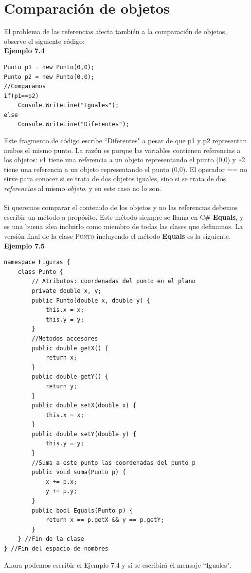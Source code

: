 \documentclass[12pt,a4paper]{report}
\begin{document}
\section{Comparación de objetos}
El problema de las referencias afecta también a la comparación de objetos, observe el siguiente código:\\\textbf{Ejemplo 7.4}
\begin{lstlisting}
Punto p1 = new Punto(0,0);
Punto p2 = new Punto(0,0);
//Comparamos
if(p1==p2)
	Console.WriteLine("Iguales");
else
	Console.WriteLine("Diferentes");
\end{lstlisting}Este fragmento de código escribe ``Diferentes" a pesar de que p1 y p2 representan ambos el mismo punto. La razón es porque las variables contienen referencias a los objetos: \textsc{p1} tiene una referencia a un objeto representando el punto (0,0) y \textsc{p2} tiene una referencia a un objeto representando el punto (0,0). El operador == no sirve para conocer si se trata de dos objetos iguales, sino si se trata de dos \textit{referencias} al mismo \textit{objeto}, y en este caso no lo son.\\\\Si queremos comparar el contenido de los objetos y no las referencias debemos escribir un método a propósito. Este método siempre se llama en C\# \textbf{Equals}, y es una buena idea incluirlo como miembro de todas las clases que definamos. La versión final de la clase \textsc{Punto} incluyendo el método \textbf{Equals} es la siguiente.\\\textbf{Ejemplo 7.5}
\begin{lstlisting}
namespace Figuras {
	class Punto {
		// Atributos: coordenadas del punto en el plano
		private double x, y;
		public Punto(double x, double y) {
			this.x = x;
			this.y = y;		
		}
		//Metodos accesores
		public double getX() {
			return x;
		}
		public double getY() {
			return y;
		}
		public double setX(double x) {
			this.x = x;
		}
		public double setY(double y) {
			this.y = y;
		}
		//Suma a este punto las coordenadas del punto p
		public void suma(Punto p) {
			x += p.x;
			y += p.y;		
		}
		public bool Equals(Punto p) {
			return x == p.getX && y == p.getY;		
		} 
	} //Fin de la clase
} //Fin del espacio de nombres
\end{lstlisting}Ahora podemos escribir el Ejemplo 7.4 y sí se escribirá el mensaje ``Iguales".
\end{document}
